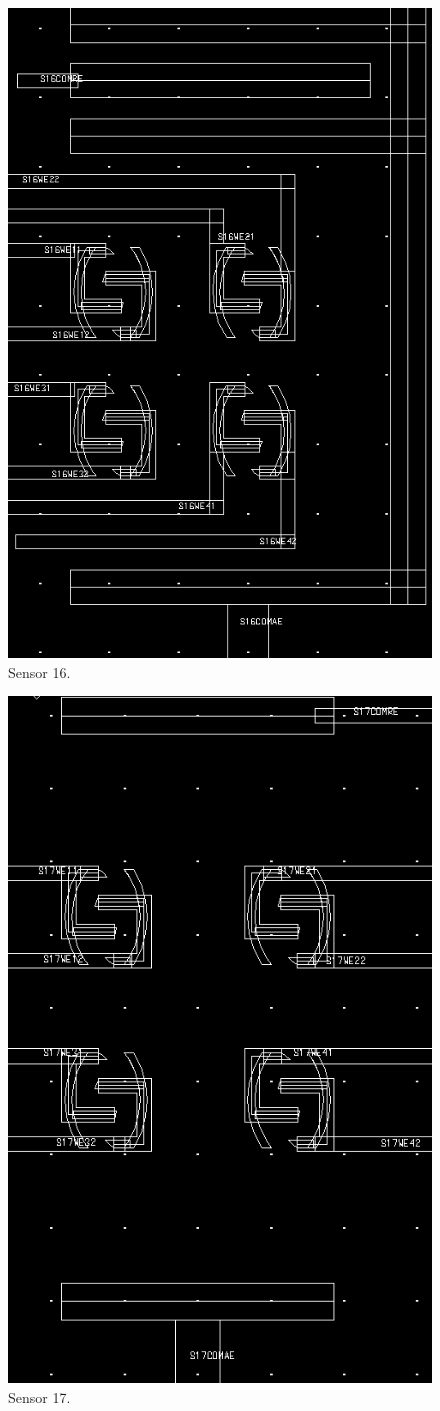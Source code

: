 \begin{figure}
	\centering
	\includegraphics[width=0.7\linewidth]{figures/s16.png}
	\caption{Sensor 16.}
	\label{s16}
\end{figure}

\begin{figure}
	\centering
	\includegraphics[width=0.7\linewidth]{figures/s17.png}
	\caption{Sensor 17.}
	\label{s17}
\end{figure}

